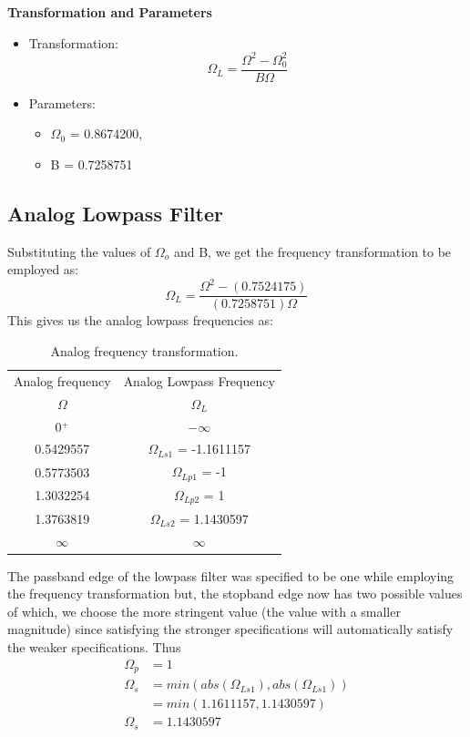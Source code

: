 \documentclass[12pt]{article}
\begin{document}
\newpage
\hline
\vspace{10pt}
\textbf{Transformation and Parameters}
\begin{itemize}
    \item Transformation:\[\Omega_L = \frac{\Omega^2 - \Omega_0^2}{B\Omega}\]
    \item Parameters:
    \begin{itemize}
        \item $\Omega_0$ = 0.8674200,
        \item B = 0.7258751
    \end{itemize}
\end{itemize}
\hline

\subsection{Analog Lowpass Filter}
Substituting the values of $\Omega_o$ and B, we get the frequency transformation to be employed as:
\[\Omega_L = \frac{\Omega^2 - (0.7524175)}{(0.7258751)\Omega}\]
This gives us the analog lowpass frequencies as:
\begin{table}[h]
    \centering
    \begin{tabular}{|c|c|}\hline
         Analog frequency&Analog Lowpass Frequency\\
         $\Omega$ &$\Omega_L$\\\hline
         0$^+$&$-\infty$\\\hline
         0.5429557&$\Omega_{Ls1}$ = -1.1611157\\\hline
         0.5773503&$\Omega_{Lp1}$ = -1\\\hline
         1.3032254&$\Omega_{Lp2}$ = 1\\\hline
         1.3763819&$\Omega_{Ls2}$ = 1.1430597\\\hline
         $\infty$&$\infty$\\\hline
    \end{tabular}
    \caption{Analog frequency transformation.}
    \label{tab:3}
\end{table}

The passband edge of the lowpass filter was specified to be one while employing the frequency transformation but, the stopband edge now has two possible values of which, we choose the more stringent value (the value with a smaller magnitude) since satisfying the stronger specifications will automatically satisfy the weaker specifications. Thus
\begin{align*}
    \Omega_p &= 1\\
    \Omega_s &= min(abs(\Omega_{Ls1}), abs(\Omega_{Ls1}))\\
    &= min(1.1611157, 1.1430597)\\
    \Omega_s &= 1.1430597
\end{align*}
\end{document}

